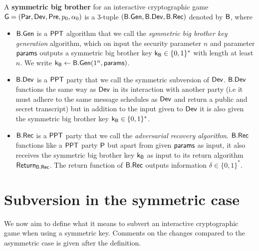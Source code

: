 \begin{defn}
	A \textbf{symmetric big brother} for an interactive cryptographic game $\operatorname{\mathsf{G}}=\left(\operatorname{\mathsf{Par}},\operatorname{\mathsf{Dev}},\operatorname{\mathsf{Pre}},p_{0},\alpha_{0}\right)$ is a 3-tuple $(\mathsf{B}.\mathsf{Gen},\mathsf{B}.\mathsf{Dev}, \mathsf{B}.\mathsf{Rec})$ denoted by $\mathsf{B}$, where
	\begin{itemize}
	\itemsep-0.1em
		\item $\mathsf{B}.\mathsf{Gen}$ is a $\mathsf{PPT}$ algorithm that we call the \emph{symmetric big brother key generation} algorithm, which on input the security parameter $n$  and parameter $\mathsf{params}$ outputs a symmetric big brother key $\mathsf{k}_{\mathsf{B}}\in\{0,1\}^*$ with length at least $n$. We write $\mathsf{k}_{\mathsf{B}}\leftarrow \mathsf{B}.\mathsf{Gen}(1^n, \mathsf{params})$. 
		\item $\mathsf{B}.\mathsf{Dev}$ is a $\mathsf{PPT}$ party that we call the symmetric subversion of $\operatorname{\mathsf{Dev}}$. $\mathsf{B}.\mathsf{Dev}$ functions the same way as $\operatorname{\mathsf{Dev}}$ in its interaction with another party (i.e it must adhere to the same message schedules as $\operatorname{\mathsf{Dev}}$ and return a public and secret transcript) but in addition to the input given to $\operatorname{\mathsf{Dev}}$ it is also given the symmetric big brother key $\mathsf{k}_{\mathsf{B}}\in\{0,1\}^*$. 
		\item $\mathsf{B}.\mathsf{Rec}$ is a $\mathsf{PPT}$ party that we call the \textit{adversarial recovery algorithm}. $\mathsf{B}.\mathsf{Rec}$ functions like a $\mathsf{PPT}$ party $\mathsf{P}$ but apart from given $\mathsf{params}$ as input, it also receives the symmetric big brother key $\mathsf{k}_{\mathsf{B}}$ as input to its return algorithm $\operatorname{\mathsf{Return}}_{\mathsf{B}.\mathsf{Rec}}$. The return function of $\mathsf{B}.\mathsf{Rec}$ outputs information $\delta\in\{0,1\}^*$. 
	\end{itemize} 
\end{defn}

\section{Subversion in the symmetric case}

We now aim to define what it means to subvert an interactive cryptographic game when using a symmetric key. Comments on the changes compared to the asymmetric case is given after the definition.

